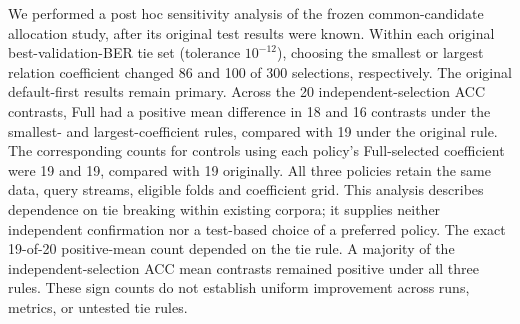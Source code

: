 We performed a post hoc sensitivity analysis of the frozen common-candidate allocation study, after its original test results were known. Within each original best-validation-BER tie set (tolerance $10^{-12}$), choosing the smallest or largest relation coefficient changed 86 and 100 of 300 selections, respectively. The original default-first results remain primary. Across the 20 independent-selection ACC contrasts, Full had a positive mean difference in 18 and 16 contrasts under the smallest- and largest-coefficient rules, compared with 19 under the original rule. The corresponding counts for controls using each policy's Full-selected coefficient were 19 and 19, compared with 19 originally. All three policies retain the same data, query streams, eligible folds and coefficient grid. This analysis describes dependence on tie breaking within existing corpora; it supplies neither independent confirmation nor a test-based choice of a preferred policy.
The exact 19-of-20 positive-mean count depended on the tie rule. A majority of the independent-selection ACC mean contrasts remained positive under all three rules. These sign counts do not establish uniform improvement across runs, metrics, or untested tie rules.

